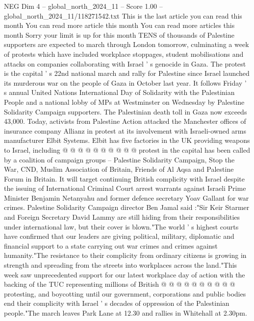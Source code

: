 \begin{textsample}{NEG Dim 4 – global\_north\_2024\_11 – Score 1.00 – global\_north\_2024\_11/118271542.txt}  \label{ex:f4_neg_170}
This is the last article you can read this month You can read more article this month You can read more articles this month Sorry your limit is up for this month TENS of thousands of Palestine supporters are expected to march through London tomorrow, culminating a week of protests which have included workplace stoppages, student mobilisations and attacks on companies collaborating with Israel ' s genocide in Gaza.
The protest is the capital ' s 22nd national march and rally for Palestine since Israel launched its murderous war on the people of Gaza in October last year.
It follows Friday ' s annual United Nations International Day of Solidarity with the Palestinian People and a national lobby of MPs at Westminster on Wednesday by Palestine Solidarity Campaign supporters.
The Palestinian death toll in Gaza now exceeds 43,000.
Today, activists from Palestine Action attacked the Manchester offices of insurance company Allianz in protest at its involvement with Israeli-owned arms manufacturer Elbit Systems.
Elbit has five factories in the UK providing weapons to Israel, including @ @ @ @ @ @ @ @ @ @ protest in the capital has been called by a coalition of campaign groups -- Palestine Solidarity Campaign, Stop the War, CND, Muslim Association of Britain, Friends of Al Aqsa and Palestine Forum in Britain.
It will target continuing British complicity with Israel despite the issuing of International Criminal Court arrest warrants against Israeli Prime Minister Benjamin Netanyahu and former defence secretary Yoav Gallant for war crimes.
Palestine Solidarity Campaign director Ben Jamal said :"Sir Keir Starmer and Foreign Secretary David Lammy are still hiding from their responsibilities under international law, but their cover is blown."The world ' s highest courts have confirmed that our leaders are giving political, military, diplomatic and financial support to a state carrying out war crimes and crimes against humanity."The resistance to their complicity from ordinary citizens is growing in strength and spreading from the streets into workplaces across the land."This week saw unprecedented support for our latest workplace day of action with the backing of the TUC representing millions of British @ @ @ @ @ @ @ @ @ @ protesting, and boycotting until our government, corporations and public bodies end their complicity with Israel ' s decades of oppression of the Palestinian people."The march leaves Park Lane at 12.30 and rallies in Whitehall at 2.30pm.

\end{textsample}

